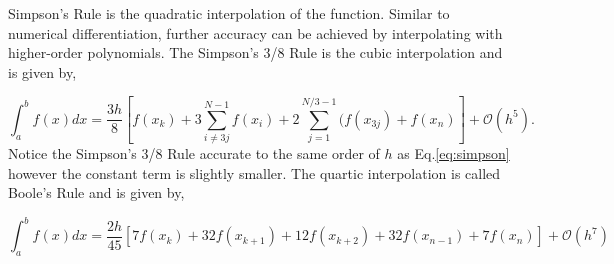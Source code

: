 \documentclass[10pt]{article}
\begin{document}
Simpson's Rule is the quadratic interpolation of the function. Similar to numerical differentiation, further accuracy can be achieved by interpolating with higher-order polynomials. The Simpson's 3/8 Rule is the cubic interpolation and is given by,

\begin{equation}
	\label{eq:simpson3/8}
	\int^b_a f(x)dx = \frac{3h}{8}[f(x_k)+3\sum^{N-1}_{i\neq 3j} f(x_i) + 2\sum^{N/3-1}_{j=1} (f(x_{3j})+f(x_n)] + \mathcal{O}(h^5).
\end{equation}
Notice the Simpson's 3/8 Rule accurate to the same order of $h$ as Eq.\ref{eq:simpson} however the constant term is slightly smaller. The quartic interpolation is called Boole's Rule and is given by,

\begin{equation}
	\label{eq:boole}
	\int^b_a f(x)dx = \frac{2h}{45}[ 7f(x_k)+32f(x_{k+1})+12f(x_{k+2})+32f(x_{n-1})+7f(x_n)] + \mathcal{O}(h^7)
\end{equation}
\end{document}
